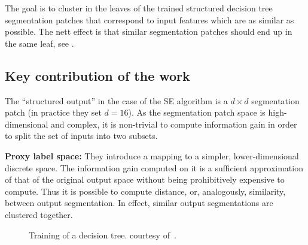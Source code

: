 The goal is to cluster in the leaves of the trained structured decision tree segmentation patches that correspond to input features which are as similar as possible. The nett effect is that similar segmentation patches should end up in the same leaf, see .

\subsection{Key contribution of the work}
The ``structured output'' in the case of the SE algorithm is a $d\times d$ segmentation patch (in practice they set $d = 16$). 
As the segmentation patch space is high-dimensional and complex, it is non-trivial to compute information gain in order to split the set of inputs into two subsets.

\textbf{Proxy label space:} They introduce a mapping to a simpler, lower-dimensional discrete space. The information gain computed on it is a sufficient approximation of that of the original output space without being prohibitively expensive to compute. Thus it is possible to compute distance, or, analogously, similarity, between output segmentation. In effect, similar output segmentations are clustered together.

\begin{figure}[ht!]
\centering
\caption{Training of a decision tree. \protect{} courtesy of~\cite{DollarICCV13PresentationSlides}.}
\label{fig:srf-training}
\end{figure}


